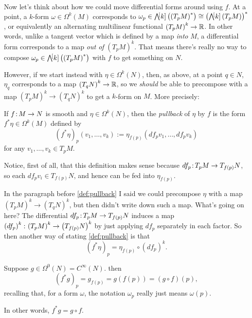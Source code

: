 Now let's think about how we could move differential forms around using $f$. At a point, a $k$-form $\omega \in \Omega^k(M)$ corresponds to $\omega_p \in \ext[k]\left(\left(T_pM\right)^\ast\right) \cong \left(\ext[k]\left(T_pM\right)\right)^\ast$, or equivalently an alternating multilinear functional $\left(T_pM\right)^k \to \mathbb{R}$. In other words, unlike a tangent vector which is defined by a map \emph{into} $M$, a differential form corresponds to a map \emph{out of} $\left(T_pM\right)^k$. That means there's really no way to compose $\omega_p \in \ext[k]\left(\left(T_pM\right)^\ast\right)$ with $f$ to get something on $N$.

However, if we start instead with $\eta \in \Omega^k(N)$, then, as above, at a point $q \in N$, $\eta_q$ corresponds to a map $\left(T_qN\right)^k \to \mathbb{R}$, so we \emph{should} be able to precompose with a map $\left(T_pM\right)^k \to \left(T_q N \right)^k$ to get a $k$-form on $M$. More precisely:

\begin{definition}\label{def:pullback}
	If $f \colon\thinspace\!\! M \to N$ is smooth and $\eta \in \Omega^k(N)$, then the \emph{pullback} of $\eta$ by $f$ is the form $f^\ast \eta \in \Omega^k(M)$ defined by
	\[
		(f^\ast \eta)_p(v_1, \dots , v_k) := \eta_{f(p)}(df_p v_1, \dots, df_pv_k)
	\]
	for any $v_1, \dots , v_k \in T_pM$.
\end{definition}

Notice, first of all, that this definition makes sense because $df_p\colon\thinspace\!\! T_pM \to T_{f(p)}N$, so each $df_p v_i \in T_{f(p)}N$, and hence can be fed into $\eta_{f(p)}$. 

In the paragraph before \cref{def:pullback} I said we could precompose $\eta$ with a map $\left(T_pM\right)^k \to \left(T_q N \right)^k$, but then didn't write down such a map. What's going on here? The differential $df_p \colon\thinspace\!\! T_p M \to T_{f(p)}N$ induces a map $\left(df_p\right)^k \colon\thinspace\!\! \left(T_p M\right)^k \to \left(T_{f(p)}N\right)^k$ by just applying $df_p$ separately in each factor. So then another way of stating \cref{def:pullback} is that 
\[ 
	(f^\ast \eta)_p = \eta_{f(p)} \circ (df_p)^k.
\]

\begin{example}
	Suppose $g \in \Omega^0(N) = C^\infty(N)$. then 
	\[
		(f^\ast g)_p = g_{f(p)} = g(f(p)) = (g \circ f)(p),
	\]
	recalling that, for a form $\omega$, the notation $\omega_p$ really just means $\omega(p)$.
	
	In other words, $f^\ast g = g \circ f$.
\end{example}

